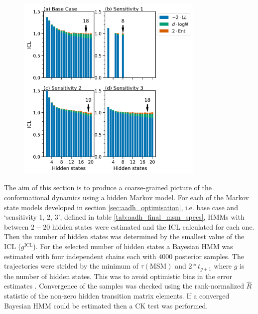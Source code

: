 \begin{figure}
    \centering
    \includegraphics[width=0.8\textwidth]{chapters/aadh/figures/aadh_h_state_selection.png}
    \label{fig:aadh_h_selection_results}
\end{figure}

The aim of this section is to produce a coarse-grained picture of the conformational dynamics using a hidden Markov model. For each of the Markov state models developed in section \ref{sec:aadh_optimisation}, i.e. base case and `sensitivity 1, 2, 3', defined in table \ref{tab:aadh_final_msm_specs}, HMMs with between $2 - 20$ hidden states were estimated and the ICL calculated for each one. Then the number of hidden states was determined by the smallest value of the ICL ($g^{\mathrm{ICL}}$). For the selected number of hidden states a Bayesian HMM was estimated with four independent chains each with $4000$ posterior samples. The trajectories were strided by the minimum of $\tau(\mathrm{MSM})$ and $2*t_{g+1}$ where $g$ is the number of hidden states. This was to avoid optimistic bias in the error estimates \cite{trendelkamp-schroerEstimationUncertaintyReversible2015b}. Convergence of the samples was checked using the rank-normalized $\hat{R}$ statistic \cite{vehtariRanknormalizationFoldingLocalization2020} of the non-zero hidden transition matrix elements. If a converged Bayesian HMM could be estimated then a CK test was performed. 

